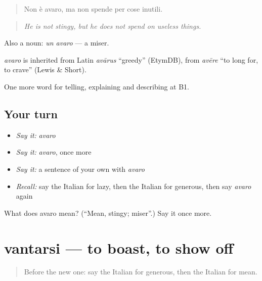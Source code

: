 \begin{quote}
Non è avaro, ma non spende per cose inutili.
\end{quote}

\begin{quote}
\emph{He is not stingy, but he does not spend on useless things.}
\end{quote}

Also a noun: \emph{un avaro} — a miser.

\begin{cousinweb}
\emph{avaro} is inherited from Latin \emph{avārus} \textquotedblleft{}greedy\textquotedblright{} (EtymDB), from \emph{avēre} \textquotedblleft{}to long for, to crave\textquotedblright{} (Lewis \& Short).
\end{cousinweb}

\begin{grammarlens}[title={What you've built}]
One more word for telling, explaining and describing at B1.
\end{grammarlens}

\subsection*{Your turn}
\begin{itemize}
\raggedright
  \item \emph{Say it:} \emph{avaro}
  \item \emph{Say it:} \emph{avaro}, once more
  \item \emph{Say it:} a sentence of your own with \emph{avaro}
  \item \emph{Recall:} say the Italian for lazy, then the Italian for generous, then say \emph{avaro} again
\end{itemize}

\begin{tcolorbox}[breakable,colback=teal!4,colframe=teal!35!black,title={Before you move on}]
What does avaro mean? (\textquotedblleft{}Mean, stingy; miser\textquotedblright{}.) Say it once more.
\end{tcolorbox}
\section[vantarsi]{vantarsi — to boast, to show off}

\label{lesson:IT-C472-vantarsi}



\begin{quote}
Before the new one: say the Italian for generous, then the Italian for mean.
\end{quote}

